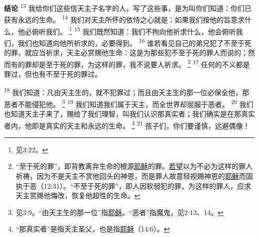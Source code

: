 \textbf{结论\quad}
\textsuperscript{13}
我给你们这些信天主子名字的人，写了这些事，是为叫你们知道：你们已获有永远的生命。
\textsuperscript{14}
我们对天主所怀的依恃之心就是：如果我们按他的旨意求什么，他必俯听我们。
\footnote{见3:22。}
\textsuperscript{15}
我们既然知道：我们不拘向他祈求什么，他会俯听我们，我们也知道向他所祈求的，必要得到。
\textsuperscript{16}
谁若看见自己的弟兄犯了不至于死的罪，就应当祈求，天主必赏赐他生命：这是为那些犯不至于死的罪人而说的；然而有的罪却是至于死的罪，为这样的罪，我不说要人祈求。
\footnote{“至于死的罪”，即背教离弃生命的根源\uline{耶稣}的罪。\uline{若望}以为不必为这样的罪人祈祷，因为不是天主不赏他回头的神恩，而是罪人故意轻视赐神恩的\uline{耶稣}而固执于恶（12:31）。“不至于死的罪”，即人因软弱犯的罪，为这样的罪人，应求天主赏赐他悔改，恢复他超性的生命。}
\textsuperscript{17}
任何的不义都是罪过，但也有不至于死的罪过。

\textsuperscript{18}
我们知道：凡由天主生的，就不犯罪过；而且由天主生的那一位必保全他，那恶者不能侵犯他。
\footnote{见3:9。“由天主生的那一位”指\uline{耶稣}。“恶者”指魔鬼，见2:13、14。}
\textsuperscript{19}
我们知道我们属于天主，而全世界却屈服于恶者。
\textsuperscript{20}
我们也知道天主子来了，赐给了我们理智，叫我们认识那真实者；我们确实是在那真实者内，他即是真实的天主和永远的生命。
\footnote{“那真实者”是指天主圣父，也是指\uline{耶稣}（14:6）。}
\textsuperscript{21}
孩子们，你们要谨慎，远避偶像！
